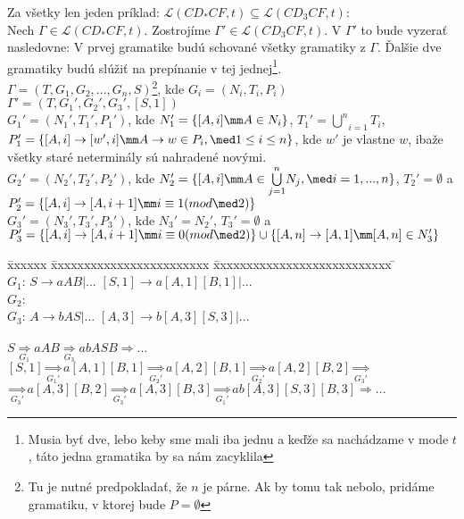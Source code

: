 \begin{dokaz}
Za všetky len jeden príklad: $\mathcal{L}(CD_*CF,t)\subseteq\mathcal{L}(CD_3CF,t)$:\\
Nech $\Gamma \in \mathcal{L}(CD_*CF,t)$. Zostrojíme $\Gamma' \in \mathcal{L}(CD_3CF,t)$.
V $\Gamma'$ to bude vyzerať nasledovne: V prvej gramatike budú schované všetky gramatiky
z $\Gamma$. Ďalšie dve gramatiky budú slúžiť na prepínanie v tej jednej\footnote{Musia
byť dve, lebo keby sme mali iba jednu a keďže sa nachádzame v mode $t$, táto jedna
gramatika by sa nám zacyklila}.\\ $\Gamma=(T,G_1,G_2,...,G_n,S)$\footnote{Tu je nutné
predpokladať, že $n$ je párne. Ak by tomu tak nebolo, pridáme gramatiku, v ktorej bude
$P=\emptyset$}, kde $G_i=(N_i,T_i,P_i)$\\ $\Gamma'=(T,G_1',G_2',G_3',[S,1])$\\
$G_1'=(N_1',T_1',P_1')$, kde $N_1'=\{[A,i]\mm A\in N_i\}$,
$T_1'=\underset{i=1}{\overset{n}\bigcup}T_i$, $P_1'=\{[A,i]\rightarrow[w',i]\mm
A\rightarrow w\in P_i, \med 1\leq i \leq n\}$, kde $w'$ je vlastne $w$, ibaže všetky
staré neterminály sú nahradené novými.\\ $G_2'=(N_2',T_2',P_2')$, kde $N_2'=\{[A,i]\mm
A\in \underset{j=1}{\overset{n}\bigcup}N_j,\med i=1,...,n\}$, $T_2'=\emptyset$ a
$P_2'=\{[A,i]\rightarrow[A,i+1]\mm i\equiv 1(mod\med 2)\}$\\ $G_3'=(N_3',T_3',P_3')$, kde
$N_3'=N_2'$, $T_3'=\emptyset$ a $P_3'=\{[A,i]\rightarrow[A,i+1]\mm i\equiv 0(mod\med
2)\}\\ \cup\{[A,n]\rightarrow[A,1]\mm [A,n]\in N_3'\} $
\end{dokaz}

\begin{priklad}
\begin{tabbing}
\= xxxxxx \= xxxxxxxxxxxxxxxxxxxxxxxx \= xxxxxxxxxxxxxxxxxxxxxxxxxxx \= \kill\\
\>\> $G_1$: $S\rightarrow aAB|...$ \> $[S,1]\rightarrow a[A,1][B,1]|...$ \\
\>\> $G_2$:\\
\>\> $G_3$: $A\rightarrow bAS|...$ \> $[A,3]\rightarrow b[A,3][S,3]|...$\\ \\
\>\> $S\underset{G_1}\Rightarrow aAB\underset{G_3}\Rightarrow abASB\Rightarrow...$
\> $[S,1]\underset{G_1'}\Rightarrow a[A,1][B,1]\underset{G_2'}\Rightarrow a[A,2][B,1]
\underset{G_2'}\Rightarrow a[A,2][B,2] \underset{G_3'}\Rightarrow$ \\
\>\>\>$\underset{G_3'}\Rightarrow a[A,3][B,2]\underset{G_3'}\Rightarrow a[A,3][B,3]
\underset{G_1'}\Rightarrow ab[A,3][S,3][B,3]\Rightarrow ...$ \\
\end{tabbing}
\end{priklad}

